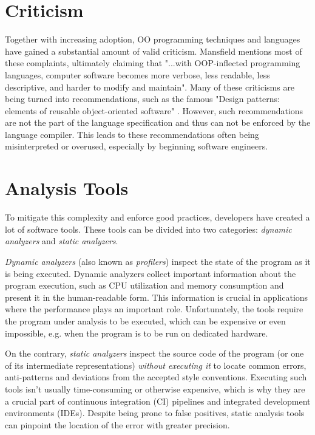 \section{Criticism}

Together with increasing adoption, OO programming techniques and languages have gained a substantial amount of valid criticism. Mansfield \cite{oopfailed} mentions most of these complaints, ultimately claiming that "...with OOP-inflected programming languages, computer software becomes more
verbose, less readable, less descriptive, and harder to modify and maintain". Many of these criticisms are being turned into recommendations, such as the famous "Design patterns: elements of reusable object-oriented software" \cite{GOFPatterns}. However, such recommendations are not the part of the language specification and thus can not be enforced by the language compiler. This leads to these recommendations often being misinterpreted or overused, especially by beginning software engineers.

\section{Analysis Tools}
To mitigate this complexity and enforce good practices, developers have created a lot of software tools. These tools can be divided into two categories: \textit{dynamic analyzers} and \textit{static analyzers}. 

\textit{Dynamic analyzers} (also known as \textit{profilers}) inspect the state of the program as it is being executed. Dynamic analyzers collect important information about the program execution, such as CPU utilization and memory consumption and present it in the human-readable form. This information is crucial in applications where the performance plays an important role. Unfortunately, the tools require the program under analysis to be executed, which can be expensive or even impossible, e.g. when the program is to be run on dedicated hardware. 

On the contrary, \textit{static analyzers} inspect the source code of the program (or one of its intermediate representations) \textit{without executing it} to locate common errors, anti-patterns and deviations from the accepted style conventions. Executing such tools isn't usually time-consuming or otherwise expensive, which is why they are a crucial part of continuous integration (CI) pipelines and integrated development environments (IDEs). 
Despite being prone to false positives, static analysis tools can pinpoint the location of the error with greater precision.


